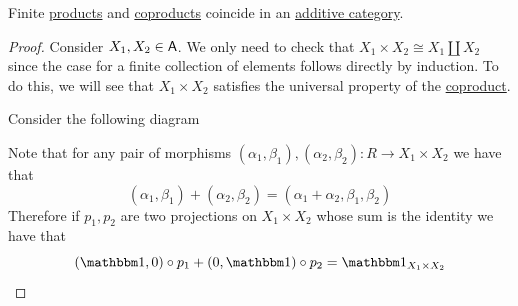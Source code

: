 \documentclass[../../../main]{subfiles}
\begin{document}
\begin{lemma} \label{lemma:products-coproducts-additive}
  Finite \hyperref[def:categorical-product]{products} and \hyperref[def:categorical-coproduct]{coproducts} coincide in an \hyperref[def:additive-category]{additive category}.
\end{lemma}
\begin{proof}
  Consider \(X_{1}, X_{2} \in \mathsf{A}\). We only need to check that \(X_{1} \times X_{2} \cong X_{1} \amalg X_{2}\) since the case for a finite collection of elements follows directly by induction.
  To do this, we will see that \(X_{1} \times X_{2}\) satisfies the universal property of the \hyperref[def:categorical-coproduct]{coproduct}.

  Consider the following diagram
  \begin{center}
  \end{center}

  Note that for any pair of morphisms \((\alpha_{1}, \beta_{1}), (\alpha_{2}, \beta_{2}): R \to X_{1} \times X_{2}\) we have that
  \begin{equation*}
    (\alpha_{1}, \beta_{1}) + (\alpha_{2}, \beta_{2}) = (\alpha_{1} + \alpha_{2}, \beta_{1}, \beta_{2})
  \end{equation*}
  Therefore if \(p_{1}, p_{2}\) are two projections on \(X_{1} \times X_{2}\) whose sum is the identity we have that
  \begin{equation*}
    (\id, 0) \circ p_{1} + (0, \id) \circ p_{2} = \id_{X_{1} \times X_{2}}
  \end{equation*}


\end{proof}
\end{document}
